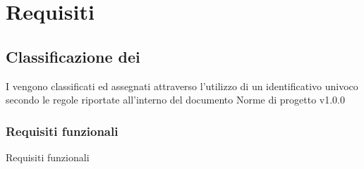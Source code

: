 \clearpage
{}

\section{Requisiti}
\subsection{Classificazione dei }
I  vengono classificati ed assegnati attraverso l'utilizzo di un identificativo univoco secondo le regole riportate all'interno del documento Norme di progetto v1.0.0
\subsubsection{Requisiti funzionali}
Requisiti funzionali
